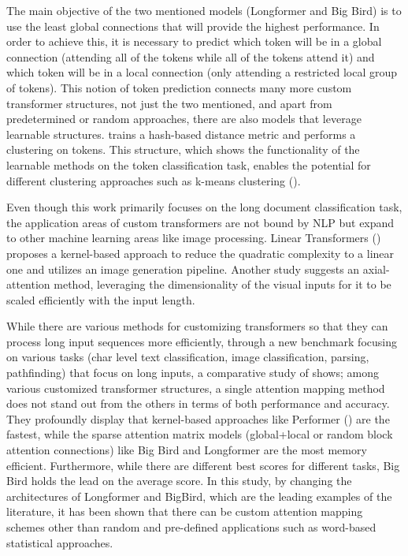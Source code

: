 \documentclass{iyte}
\begin{document}
The main objective of the two mentioned models (Longformer and Big Bird) is to use the least global connections that will provide the highest performance. In order to achieve this, it is necessary to predict which token will be in a global connection (attending all of the tokens while all of the tokens attend it) and which token will be in a local connection (only attending a restricted local group of tokens). This notion of token prediction connects many more custom transformer structures, not just the two mentioned, and apart from predetermined or random approaches, there are also models that leverage learnable structures. \cite{reformer} trains a hash-based distance metric and performs a clustering on tokens. This structure, which shows the functionality of the learnable methods on the token classification task, enables the potential for different clustering approaches such as k-means clustering (\citealt{routing_transformers}). 

Even though this work primarily focuses on the long document classification task, the application areas of custom transformers are not bound by NLP but expand to other machine learning areas like image processing. Linear Transformers (\citealt{linear_transformers}) proposes a kernel-based approach to reduce the quadratic complexity to a linear one and utilizes an image generation pipeline. Another study \cite{axial_transformer} suggests an axial-attention method, leveraging the dimensionality of the visual inputs for it to be scaled efficiently with the input length.

While there are various methods for customizing transformers so that they can process long input sequences more efficiently, through a new benchmark focusing on various tasks (char level text classification, image classification, parsing, pathfinding) that focus on long inputs, a comparative study of \cite{benchmark_LRA} shows; among various customized transformer structures, a single attention mapping method does not stand out from the others in terms of both performance and accuracy. They profoundly display that kernel-based approaches like Performer (\citealt{performer}) are the fastest, while the sparse attention matrix models (global+local or random block attention connections) like Big Bird and Longformer are the most memory efficient. Furthermore, while there are different best scores for different tasks, Big Bird holds the lead on the average score. In this study, by changing the architectures of Longformer and BigBird, which are the leading examples of the literature, it has been shown that there can be custom attention mapping schemes other than random and pre-defined applications such as word-based statistical approaches.
\end{document}
